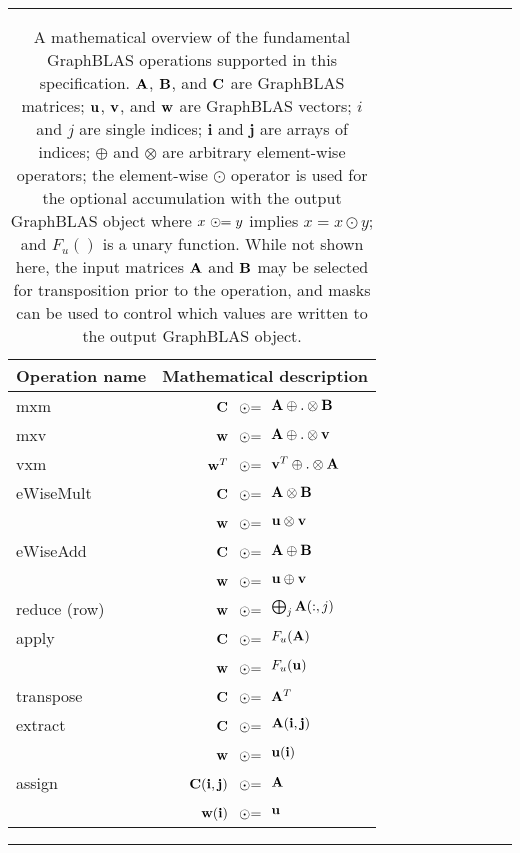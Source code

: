 \begin{table}[h]
\hrule
\begin{center}
\caption{A mathematical overview of the fundamental GraphBLAS operations supported
in this specification. ${\bf A}$, ${\bf B}$, and ${\bf C}$ are GraphBLAS matrices; 
${\bf u}$, ${\bf v}$, and ${\bf w}$ are GraphBLAS vectors; $i$ and $j$ are single indices;
$\mathbf{i}$ and $\mathbf{j}$ are arrays of indices;
$\oplus$ and $\otimes$ are arbitrary element-wise operators; the element-wise $\odot$
operator is used for the optional accumulation with the output GraphBLAS object where 
$x~\odot\hspace{-0.11cm}= y$ implies $x = x \odot y$; and $F_u()$ is a unary function.
While not shown here, the input 
matrices ${\bf A}$ and ${\bf B}$ may be selected for transposition prior to 
the operation, and masks can be used to control which values are written to the output GraphBLAS object.}
\label{Tab:GraphBLASOps}
\newcommand{\odotequals}{~\odot\hspace{-0.09cm}=\hspace{-0.2cm}}
\begin{tabular}{l|rl}
{\sf Operation name} & \multicolumn{2}{c}{Mathematical description}  \\
\hline
{\sf mxm}          & ${\bf C}$    $\odotequals$ & ${\bf A} \oplus.\otimes {\bf B}$ \\
{\sf mxv}          & ${\bf w}$    $\odotequals$ & ${\bf A} \oplus.\otimes {\bf v}$ \\
{\sf vxm}          & ${\bf w}^T$  $\odotequals$ & ${\bf v}^T \oplus.\otimes {\bf A}$  \\
{\sf eWiseMult}    & ${\bf C}$    $\odotequals$ & ${\bf A} \otimes {\bf B}$ \\
                   & ${\bf w}$    $\odotequals$ & ${\bf u} \otimes {\bf v}$ \\
{\sf eWiseAdd}     & ${\bf C}$    $\odotequals$ & ${\bf A} \oplus {\bf B}$ \\
                   & ${\bf w}$    $\odotequals$ & ${\bf u} \oplus {\bf v}$ \\
{\sf reduce} (row) & ${\bf w}$    $\odotequals$ & $\bigoplus_j{\bf A}(:,j)$  \\
{\sf apply}        & ${\bf C}$    $\odotequals$ & $F_u({\bf A})$ \\
                   & ${\bf w}$    $\odotequals$ & $F_u({\bf u})$ \\
{\sf transpose}    & ${\bf C}$    $\odotequals$ & ${\bf A}^T$ \\
{\sf extract}      & ${\bf C}$    $\odotequals$ & ${\bf A}({\bf i},{\bf j})$ \\
                   & ${\bf w}$    $\odotequals$ & ${\bf u}({\bf i})$ \\
{\sf assign}       & ${\bf C}({\bf i},{\bf j})$  $\odotequals$ &  ${\bf A}$ \\
                   & ${\bf w}({\bf i})$  $\odotequals$ & ${\bf u}$ 
\end{tabular}

\end{center}
\hrule
\end{table}


